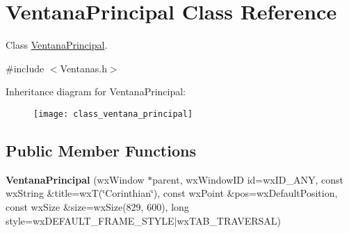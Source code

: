 \hypertarget{class_ventana_principal}{}\section{Ventana\+Principal Class Reference}
\label{class_ventana_principal}


Class \hyperlink{class_ventana_principal}{Ventana\+Principal}.  




{\ttfamily \#include $<$Ventanas.\+h$>$}

Inheritance diagram for Ventana\+Principal\+:\begin{figure}[H]
\begin{center}
\leavevmode
\texttt{[image: class\_ventana\_principal]}
\end{center}
\end{figure}
\subsection*{Public Member Functions}
\begin{DoxyCompactItemize}
\item 
{\bfseries Ventana\+Principal} (wx\+Window $\ast$parent, wx\+Window\+ID id=wx\+I\+D\+\_\+\+A\+NY, const wx\+String \&title=wxT(\char`\"{}Corinthian\char`\"{}), const wx\+Point \&pos=wx\+Default\+Position, const wx\+Size \&size=wx\+Size(829, 600), long style=wx\+D\+E\+F\+A\+U\+L\+T\+\_\+\+F\+R\+A\+M\+E\+\_\+\+S\+T\+Y\+LE$\vert$wx\+T\+A\+B\+\_\+\+T\+R\+A\+V\+E\+R\+S\+AL)\hypertarget{class_ventana_principal_a92ee5cfcc9fda6049f70d28d5b30065b}{}\label{class_ventana_principal_a92ee5cfcc9fda6049f70d28d5b30065b}

\end{DoxyCompactItemize}
